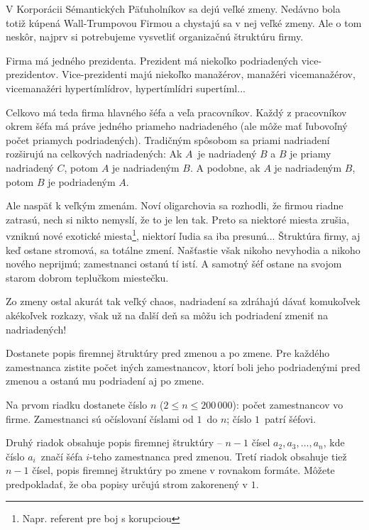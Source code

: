 
\usepackage[slovak]{babel}




V Korporácii Sémantických Päťuholníkov sa dejú veľké zmeny. Nedávno bola totiž
kúpená Wall-Trumpovou Firmou a chystajú sa v nej veľké zmeny. Ale o tom neskôr,
najprv si potrebujeme vysvetliť organizačnú štruktúru firmy.

Firma má jedného prezidenta. Prezident má niekoľko podriadených vice-prezidentov.
Vice-prezidenti majú niekoľko manažérov, manažéri vicemanažérov, vicemanažéri
hypertímlídrov, hypertímlídri supertíml...

Celkovo má teda firma hlavného šéfa a veľa pracovníkov. Každý z pracovníkov okrem šéfa
má práve jedného priameho nadriadeného (ale môže mať ľubovoľný počet priamych 
podriadených). Tradičným spôsobom sa priami nadriadení rozširujú na celkových
nadriadených: Ak $A$ je nadriadený $B$ a $B$ je priamy nadriadený $C$, potom $A$
je nadriadeným $B$. A podobne, ak $A$ je nadriadeným $B$, potom $B$ je podriadeným $A$.

Ale naspäť k veľkým zmenám. Noví oligarchovia sa rozhodli, že firmou riadne zatrasú,
nech si nikto nemyslí, že to je len tak. Preto sa niektoré miesta zrušia,
vzniknú nové exotické miesta\footnote{Napr. referent pre boj s korupciou}, niektorí ľudia sa iba
presunú... Štruktúra firmy, aj keď ostane stromová, sa totálne
zmení. Našťastie však nikoho nevyhodia a nikoho nového neprijmú; zamestnanci ostanú
tí istí. A samotný šéf ostane na svojom starom dobrom teplučkom miestečku.

Zo zmeny ostal akurát tak veľký chaos, nadriadení sa zdráhajú dávať komukoľvek
akékoľvek rozkazy, však už na ďalší deň sa môžu ich podriadení zmeniť na
nadriadených!


Dostanete popis firemnej štruktúry pred zmenou a po zmene. Pre každého zamestnanca
zistite počet iných zamestnancov, ktorí boli jeho podriadenými pred zmenou a ostanú
mu podriadení aj po zmene.


Na prvom riadku dostanete číslo $n$ ($2 \leq n \leq 200\,000$): počet zamestnancov vo firme.
Zamestnanci sú očíslovaní číslami od $1$ do $n$; číslo $1$ patrí šéfovi.

Druhý riadok obsahuje popis firemnej štruktúry -- $n-1$ čísel $a_2, a_3, \ldots, a_n$, kde
číslo $a_i$ značí šéfa $i$-teho zamestnanca pred zmenou. Tretí riadok obsahuje tiež $n-1$
čísel, popis firemnej štruktúry po zmene v rovnakom formáte. Môžete predpokladať, že oba
popisy určujú strom zakorenený v $1$.

